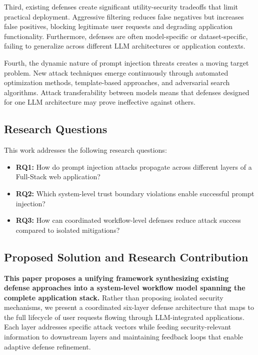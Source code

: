 \documentclass[conference]{IEEEtran}
\begin{document}
Third, existing defenses create significant utility-security tradeoffs that limit practical deployment. Aggressive filtering reduces false negatives but increases false positives, blocking legitimate user requests and degrading application functionality. Furthermore, defenses are often model-specific or dataset-specific, failing to generalize across different LLM architectures or application contexts.

Fourth, the dynamic nature of prompt injection threats creates a moving target problem. New attack techniques emerge continuously through automated optimization methods, template-based approaches, and adversarial search algorithms. Attack transferability between models means that defenses designed for one LLM architecture may prove ineffective against others.

\subsection{Research Questions}
This work addresses the following research questions:
\begin{itemize}
    \item \textbf{RQ1:} How do prompt injection attacks propagate across different layers of a Full-Stack web application?
    \item \textbf{RQ2:} Which system-level trust boundary violations enable successful prompt injection?
    \item \textbf{RQ3:} How can coordinated workflow-level defenses reduce attack success compared to isolated mitigations?
\end{itemize}

\subsection{Proposed Solution and Research Contribution}
\textbf{This paper proposes a unifying framework synthesizing existing defense approaches into a system-level workflow model spanning the complete application stack.} Rather than proposing isolated security mechanisms, we present a coordinated six-layer defense architecture that maps to the full lifecycle of user requests flowing through LLM-integrated applications. Each layer addresses specific attack vectors while feeding security-relevant information to downstream layers and maintaining feedback loops that enable adaptive defense refinement.
\end{document}
